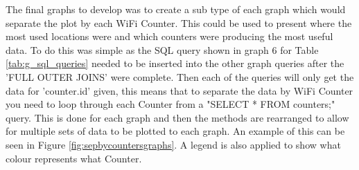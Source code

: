 \documentclass{report}
\begin{document}
The final graphs to develop was to create a sub type of each graph which would separate the plot by each WiFi Counter. This could be used to present where the most used locations were and which counters were producing the most useful data. To do this was simple as the SQL query shown in graph 6 for Table \ref{tab:g_sql_queries} needed to be inserted into the other graph queries after the 'FULL OUTER JOINS' were complete. Then each of the queries will only get the data for 'counter.id' given, this means that to separate the data by WiFi Counter you need to loop through each Counter from a "SELECT * FROM counters;" query. This is done for each graph and then the methods are rearranged to allow for multiple sets of data to be plotted to each graph. An example of this can be seen in Figure \ref{fig:sepbycountersgraphs}. A legend is also applied to show what colour represents what Counter.\\ \newline 
\clearpage
\end{document}
